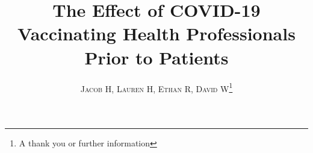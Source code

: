 \documentclass[twoside]{article}
\title{\vspace{-15mm}\fontsize{24pt}{10pt}\selectfont\textbf{The Effect of COVID-19 Vaccinating Health Professionals Prior to Patients }} %
\author{
	\large
	\textsc{Jacob H, Lauren H, Ethan R, David W}\thanks{A thank you or further information}\\[2mm] %
	\vspace{-5mm}
}
\date{}
\begin{document}
	
	\maketitle %
	
	\thispagestyle{fancy} %
	
	
	\begin{abstract}
		
		\noindent \lipsum[1] %
		
	\end{abstract}
	
	
\end{document}
